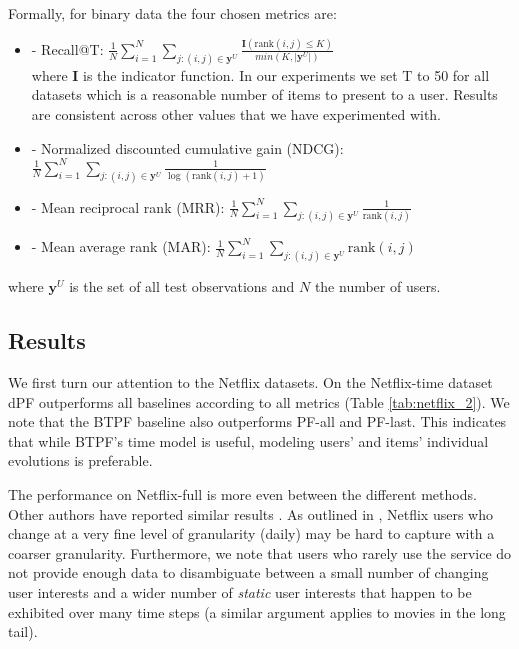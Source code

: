 \documentclass{sig-alternate}
\begin{document}
Formally, for binary data the four chosen metrics are: 
\begin{itemize}
\item[] \hspace{-0.15in} - Recall@T: $\frac{1}{N} \sum_{i=1}^N \sum_{j:
(i,j)\in \mathbf{y}^U} \frac{\mathbf{I}(\text{rank}(i,j)\leqslant K)}{min(K,|\mathbf{y}^U|)}$ \\
where $\mathbf{I}$ is the indicator function. In our experiments we set T to 50
for all datasets which is a reasonable number of items to present to a user.
Results are consistent across other values that we have experimented with. 
\item[] \hspace{-0.15in} -  Normalized discounted cumulative gain (NDCG): \\$\frac{1}{N} \sum_{i=1}^{N} \sum_{j:(i,j)\in \mathbf{y}^U} \frac{1}{\log(\text{rank}(i,j) + 1)}$
\item[] \hspace{-0.15in} -  Mean reciprocal rank (MRR): $\frac{1}{N} \sum_{i=1}^{N} \sum_{j: (i,j)\in \mathbf{y}^U} \frac{1}{\text{rank}(i,j)}$ 
\item[] \hspace{-0.15in} -  Mean average rank (MAR): $\frac{1}{N} \sum_{i=1}^{N} \sum_{j: (i,j)\in \mathbf{y}^U} \text{rank}(i,j)$ 
\end{itemize}
where $\mathbf{y}^{U}$ is the set of all test observations and $N$ the number of
users. 

\subsection{Results} \label{sec:more_results}
\noindent We first turn our attention to the Netflix datasets. On the Netflix-time
dataset dPF outperforms all baselines according to all metrics (Table
\ref{tab:netflix_2}). We note that the BTPF baseline also outperforms PF-all
and PF-last. This indicates that while BTPF's time model is useful, modeling
users' and items' individual evolutions is preferable. 

The performance on Netflix-full is more even between the different
methods. Other authors have reported similar results \citep{lxiong:10:bptf}.  As outlined in
\citet{DBLP:journals/cacm/Koren10}, Netflix users who change at a very fine level of
granularity (daily) may be hard to capture with a coarser granularity.
Furthermore, we note that users who rarely use the service do not provide
enough data to disambiguate between a small number of changing user interests
and a wider number of \emph{static} user interests that happen to be exhibited
over many time steps (a similar argument applies to movies in the long tail).
\end{document}
